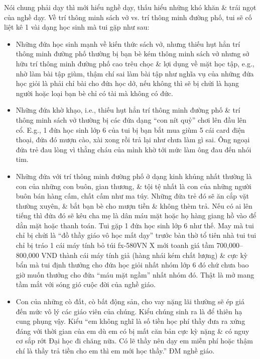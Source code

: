 \documentclass[12pt,twoside]{book}
\begin{document}
Nói chung phải dạy thì mới hiểu nghề dạy, thấu hiểu những khó khăn \& trái ngọt của nghề dạy. Về trí thông minh sách vở vs. trí thông minh đường phố, tui sẽ cố liệt kê 1 vài dạng học sinh mà tui gặp như sau:
\begin{itemize}
	\item Những đứa học sinh mạnh về kiến thức sách vở, nhưng thiếu hụt hẳn trí thông minh đường phố thường bị bạn bè kém thông minh sách vở nhưng sở hữu trí thông minh đường phố cao trêu chọc \& lợi dụng về mặt học tập, e.g., nhờ làm bài tập giùm, thậm chí sai làm bài tập như nghĩa vụ của những đứa học giỏi là phải chỉ bài cho đứa học dở, nếu không thì sẽ bị chửi là hạng người hoặc loại bạn bè chỉ có tài mà không có đức.
	\item Những đứa khờ khạo, i.e., thiếu hụt hẳn trí thông minh đường phố \& trí thông minh sách vở thường bị các đứa dạng ``con nít quỷ'' chơi lên đầu lên cổ. E.g., 1 đứa học sinh lớp 6 của tui bị bạn bắt mua giùm 5 cái card điện thoại, đứa đó mượn cào, xài xong rồi trả lại như chưa làm gì sai. Ông ngoại đứa trẻ đau lòng vì thằng cháu của mình khờ tới mức làm ông đau đến nhói tim.
	\item Những đứa với trí thông minh đường phố ở dạng kinh khủng nhất thường là con của những con buôn, gian thương, \& tội tệ nhất là con của những người buôn bán hàng cấm, chất cấm như ma túy. Những đứa trẻ đó sẽ ăn cắp vặt thường xuyên, \& bắt bạn bè cho mượn tiền \& không thèm trả. Nếu có ai lên tiếng thì đứa đó sẽ kêu cha mẹ là dân máu mặt hoặc họ hàng giang hồ vào để dằn mặt hoặc thanh toán. Tui gặp 1 đứa học sinh lớp 6 như thế. May mà tui chỉ bị chửi là ``đồ thầy giáo vô học mất dạy'' trước bàn thờ tổ tiên nhà tui tui chỉ bị tráo 1 cái máy tính bỏ túi fx-580VN X mới toanh giá tầm 700,000--800,000 VND thành cái máy tính giả (hàng nhái kém chất lượng) \& cực kỳ bẩn mà tui định thưởng cho đứa học giỏi nhất nhóm lớp 6 đó chứ chưa bao giờ muốn thưởng cho đứa ``máu mặt ngầm'' nhất nhóm đó. Thật là mở mang tầm mắt với sóng gió cuộc đời của nghề giáo.
	\item Con của những cò đất, cò bất động sản, cho vay nặng lãi thường sẽ ép giá đến mức vô lý các giáo viên của chúng. Kiểu chúng sinh ra là để thiên hạ cung phụng vậy. Kiểu ``em không nghĩ là số tiền học phí thầy đưa ra xứng đáng với thời gian của em dù em có bị mất căn bản cực kỳ nặng \& có nguy cơ sắp rớt Đại học đi chăng nữa. Có lẽ thầy nên dạy em miễn phí hoặc thậm chí là thầy trả tiền cho em thì em mới học thầy.'' ĐM nghề giáo.
\end{itemize}
\end{document}
